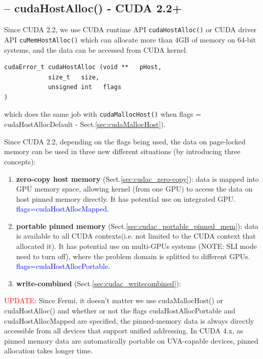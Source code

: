\subsection{-- cudaHostAlloc() - CUDA 2.2+}
\label{sec:cudaHostAlloc}

Since CUDA 2.2, we use CUDA runtime API \verb!cudaHostAlloc()! or CUDA driver API
\verb!cuMemHostAlloc()! which can allocate more than 4GB of memory on 64-bit
systems, and the data can be accessed from CUDA kernel.

\begin{verbatim}
cudaError_t cudaHostAlloc (void **   pHost,
            size_t   size,
            unsigned int   flags   
)
\end{verbatim}
which does the same job with \verb!cudaMallocHost()! when
flags = cudaHostAllocDefault - Sect.\ref{sec:cudaMallocHost}).

Since CUDA 2.2, depending on the flags being used, the data on page-locked memory can be used 
in three new different situations (by introducing three concepts):
\begin{enumerate}
  \item {\bf zero-copy host memory} (Sect.\ref{sec:cudac_zero-copy}): data is
  mapped into GPU memory space, allowing kernel (from one GPU) to access the
  data on host pinned memory directly. It has potential use on integrated GPU.
  \textcolor{blue}{flags=cudaHostAllocMapped}. 

\item {\bf portable pinned memory} (Sect.\ref{sec:cudac_portable_pinned_mem}):
data is available to all CUDA contexts(i.e. not limited to the
CUDA context that allocated it). It has potential use on multi-GPUs systems
(NOTE: SLI mode need to turn off), where the problem domain is splitted to
different GPUs.
\textcolor{blue}{flags=cudaHostAllocPortable}.

\item {\bf write-combined} (Sect.\ref{sec:cudac_writecombined}): 
\end{enumerate}

\textcolor{red}{UPDATE}: Since Fermi, it doesn't matter we use cudaMallocHost()
or cudaHostAlloc() and whether or not the flags cudaHostAllocPortable and
cudaHostAllocMapped are specified, the pinned-memory data is always directly
accessible from all devices that support unified addressing. In CUDA 4.x, as
pinned memory data are automatically portable on UVA-capable devices, pinned
allocation takes longer time.

